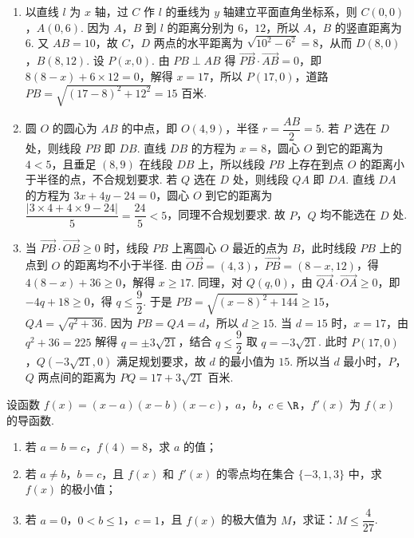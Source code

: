 \begin{solution}
\begin{enumerate}
\item 以直线 \(l\) 为 \(x\) 轴，过 \(C\) 作 \(l\) 的垂线为 \(y\) 轴建立平面直角坐标系，则 \(C(0,0)\)，\(A(0,6)\). 因为 \(A\)，\(B\) 到 \(l\) 的距离分别为 \(6\)，\(12\)，所以 \(A\)，\(B\) 的竖直距离为 \(6\). 又 \(AB=10\)，故 \(C\)，\(D\) 两点的水平距离为 \(\sqrt{10^2-6^2}=8\)，从而 \(D(8,0)\)，\(B(8,12)\). 设 \(P(x,0)\). 由 \(PB\perp AB\) 得 \(\overrightarrow{PB}\cdot\overrightarrow{AB}=0\)，即 \(8(8-x)+6\times12=0\)，解得 \(x=17\)，所以 \(P(17,0)\)，道路 \(PB=\sqrt{(17-8)^2+12^2}=15\text{ 百米}\).
\item 圆 \(O\) 的圆心为 \(AB\) 的中点，即 \(O(4,9)\)，半径 \(r=\dfrac{AB}2=5\). 若 \(P\) 选在 \(D\) 处，则线段 \(PB\) 即 \(DB\). 直线 \(DB\) 的方程为 \(x=8\)，圆心 \(O\) 到它的距离为 \(4<5\)，且垂足 \((8,9)\) 在线段 \(DB\) 上，所以线段 \(PB\) 上存在到点 \(O\) 的距离小于半径的点，不合规划要求. 若 \(Q\) 选在 \(D\) 处，则线段 \(QA\) 即 \(DA\). 直线 \(DA\) 的方程为 \(3x+4y-24=0\)，圆心 \(O\) 到它的距离为 \(\dfrac{|3\times4+4\times9-24|}{5}=\dfrac{24}{5}<5\)，同理不合规划要求. 故 \(P\)，\(Q\) 均不能选在 \(D\) 处.
\item 当 \(\overrightarrow{PB}\cdot\overrightarrow{OB}\ge0\) 时，线段 \(PB\) 上离圆心 \(O\) 最近的点为 \(B\)，此时线段 \(PB\) 上的点到 \(O\) 的距离均不小于半径. 由 \(\overrightarrow{OB}=(4,3)\)，\(\overrightarrow{PB}=(8-x,12)\)，得 \(4(8-x)+36\ge0\)，解得 \(x\ge17\). 同理，对 \(Q(q,0)\)，由 \(\overrightarrow{QA}\cdot\overrightarrow{OA}\ge0\)，即 \(-4q+18\ge0\)，得 \(q\le\dfrac92\). 于是 \(PB=\sqrt{(x-8)^2+144}\ge15\)，\(QA=\sqrt{q^2+36}\). 因为 \(PB=QA=d\)，所以 \(d\ge15\). 当 \(d=15\) 时，\(x=17\)，由 \(q^2+36=225\) 解得 \(q=\pm3\sqrt{21}\)，结合 \(q\le\dfrac92\) 取 \(q=-3\sqrt{21}\). 此时 \(P(17,0)\)，\(Q(-3\sqrt{21},0)\) 满足规划要求，故 \(d\) 的最小值为 \(15\). 所以当 \(d\) 最小时，\(P\)，\(Q\) 两点间的距离为 \(PQ=17+3\sqrt{21}\text{ 百米}\).
\end{enumerate}
\end{solution}

\begin{problem}
设函数 \(f(x)=(x-a)(x-b)(x-c)\)，\(a\)，\(b\)，\(c\in\R\)，\(f'(x)\) 为 \(f(x)\) 的导函数.

\begin{enumerate}
\item 若 \(a=b=c\)，\(f(4)=8\)，求 \(a\) 的值；
\item 若 \(a\ne b\)，\(b=c\)，且 \(f(x)\) 和 \(f'(x)\) 的零点均在集合 \(\{-3,1,3\}\) 中，求 \(f(x)\) 的极小值；
\item 若 \(a=0\)，\(0<b\le 1\)，\(c=1\)，且 \(f(x)\) 的极大值为 \(M\)，求证：\(M\le\dfrac4{27}\).
\end{enumerate}

\end{problem}

